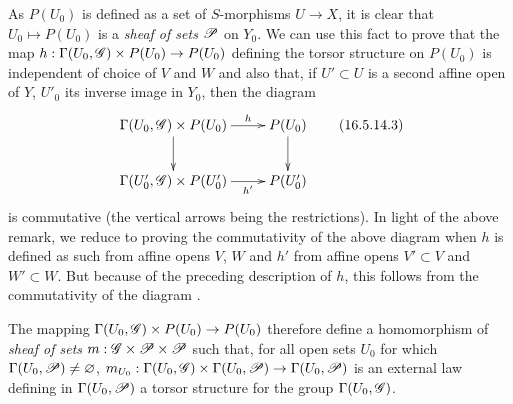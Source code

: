 \begin{env}[16.5.14]
As $P(U_0)$ is defined as a set of $S$-morphisms $U \to X$, it is clear that $U_0 \mapsto P(U_0)$ is a \emph{sheaf of sets} $\mathscr{P}$ on $Y_0$.
We can use this fact to prove that the map $h : \Gamma(U_0, \sh{G}) \times P(U_0) \to P(U_0)$ defining the torsor structure on $P(U_0)$ is independent of choice of $V$ and $W$ and also that, if $U' \subset U$ is a second affine open of $Y$, $U'_0$ its inverse image in $Y_0$, then the diagram
\[
\label{IV.16.5.14.3}
  \xymatrix{
    \Gamma(U_0, \sh{G}) \times P(U_0) \ar[d] \ar[r]^-h & P(U_0) \ar[d] \\
    \Gamma(U'_0, \sh{G}) \times P(U'_0) \ar[r]_-{h'} & P(U'_0)
  }
  \tag{16.5.14.3}
\]
is commutative (the vertical arrows being the restrictions).
In light of the above remark, we reduce to proving the commutativity of the above diagram when $h$ is defined as such from affine opens $V$, $W$ and $h'$ from affine
opens $V' \subset V$ and $W' \subset W$.
But because of the preceding description of $h$, this follows from the commutativity of the diagram .

The mapping $\Gamma(U_0, \sh{G}) \times P(U_0) \to P(U_0)$ therefore define a homomorphism of \emph{sheaf of sets} $m:\mathscr{G} \times \mathscr{P} \times \mathscr{P}$ such that, for all open sets $U_0$ for which $\Gamma(U_0, \mathscr{P}) \neq \varnothing$, $m_{U_0}:\Gamma(U_0, \sh{G}) \times \Gamma(U_0, \sh{P}) \to \Gamma(U_0, \sh{P})$ is an external law defining in $\Gamma(U_0, \mathscr{P})$ a torsor structure for the group $\Gamma(U_0, \mathscr{G})$.
\end{env}

